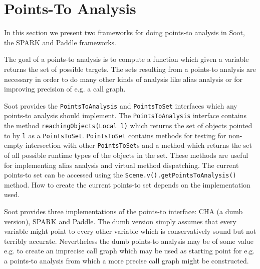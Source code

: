 \documentclass{article}
\newcommand{\remark}[1]{%
  (*) \marginpar{\raggedright\em #1}}
\newcommand{\code}[1]{\texttt{\small #1}}
\begin{document}
\section{Points-To Analysis}
\label{sec:points:to:analysis}

In this section we present two frameworks for doing points-to analysis
in Soot, the SPARK and Paddle frameworks.

The goal of a points-to analysis is to compute a function which given
a variable returns the set of possible targets. The sets resulting
from a points-to analysis are necessary in order to do many other
kinds of analysis like alias analysis or for improving precision of
e.g. a call graph.

Soot provides the \code{PointsToAnalysis} and \code{PointsToSet}
interfaces which any points-to analysis should implement. The
\code{PointsToAnalysis} interface contains the method
\code{reachingObjects(Local l)} which returns the set of objects
pointed to by \code{l} as a \code{PointsToSet}. \code{PointsToSet}
contains methods for testing for non-empty intersection with other
\code{PointsToSet}s and a method which returns the set of all possible
runtime types of the objects in the set. These methods are useful for
implementing alias analysis and virtual method dispatching. The
current points-to set can be accessed using the
\code{Scene.v().getPointsToAnalysis()} method. How to create the
current points-to set depends on the implementation used.

Soot provides three implementations of the points-to interface: CHA (a
dumb version), SPARK and Paddle.
The dumb version simply assumes that every variable might point to
every other variable which is conservatively sound but not terribly
accurate. Nevertheless the dumb points-to analysis may be of some
value e.g. to create an imprecise call graph which may be used as starting
point for e.g. a points-to analysis from which a more precise call
graph might be constructed.

\end{document}
